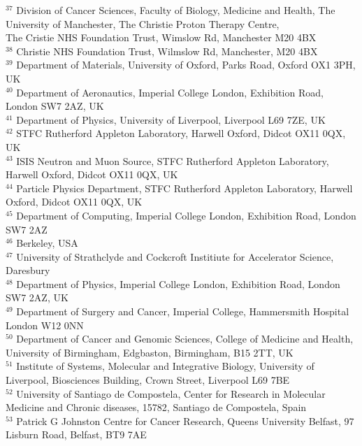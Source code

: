 {\begin{tabbing}
     $^{37}$ \> Division of Cancer Sciences, Faculty of Biology, Medicine and Health, The University of Manchester, The Christie Proton Therapy Centre, \\ \> The Cristie NHS Foundation Trust, Wimslow Rd, Manchester M20 4BX\\
     $^{38}$ \> Christie NHS Foundation Trust, Wilmslow Rd, Manchester, M20 4BX\\
     $^{39}$ \> Department of Materials, University of Oxford, Parks Road, Oxford OX1 3PH, UK\\
     $^{40}$ \> Department of Aeronautics, Imperial College London, Exhibition Road, London SW7 2AZ, UK\\
     $^{41}$ \> Department of Physics, University of Liverpool, Liverpool L69 7ZE, UK\\
     $^{42}$ \> STFC Rutherford Appleton Laboratory, Harwell Oxford, Didcot OX11 0QX, UK\\
     $^{43}$ \> ISIS Neutron and Muon Source, STFC Rutherford Appleton Laboratory, Harwell Oxford, Didcot OX11 0QX, UK\\
     $^{44}$ \> Particle Physics Department, STFC Rutherford Appleton Laboratory, Harwell Oxford, Didcot OX11 0QX, UK\\
     $^{45}$ \> Department of Computing, Imperial College London, Exhibition Road, London SW7 2AZ\\
     $^{46}$ \> Berkeley, USA\\
     $^{47}$ \> University of Strathclyde and Cockcroft Institiute for Accelerator Science, Daresbury\\
     $^{48}$ \> Department of Physics, Imperial College London, Exhibition Road, London SW7 2AZ, UK\\
     $^{49}$ \> Department of Surgery and Cancer, Imperial College, Hammersmith Hospital London W12 0NN\\
     $^{50}$ \> Department of Cancer and Genomic Sciences, College of Medicine and Health, University of Birmingham, Edgbaston, Birmingham, B15 2TT, UK\\
     $^{51}$ \> Institute of Systems, Molecular and Integrative Biology, University of Liverpool, Biosciences Building, Crown Street, Liverpool L69 7BE\\
     $^{52}$ \> University of Santiago de Compostela, Center for Research in Molecular Medicine and Chronic diseases, 15782, Santiago de Compostela, Spain\\
     $^{53}$ \> Patrick G Johnston Centre for Cancer Research, Queens University Belfast, 97 Lisburn Road, Belfast, BT9 7AE\\

\end{tabbing}}
